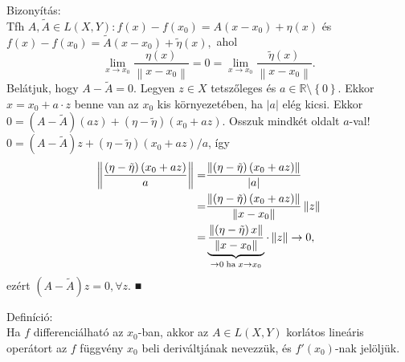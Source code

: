 \documentclass[12pt,a4paper]{scrartcl}
\newenvironment{definicio}{}{}
\newenvironment{bizonyitas}{}{}
\begin{document}
\begin{bizonyitas}

Bizonyítás:\\
Tfh
\(A,\widetilde{A} \in L\left( {X,Y} \right):f\left( x \right) - f\left( x_{0} \right) = A\left( {x - x_{0}} \right) + \eta\left( x \right)\)
és
\(f\left( x \right) - f\left( x_{0} \right) = \widetilde{A}\left( {x - x_{0}} \right) + \widetilde{\eta}{\left( x \right),}\)
ahol
\[\underset{x\rightarrow x_{0}}{\lim}\frac{\eta\left( x \right)}{\left\| {x - x_{0}} \right\|} = 0 = \underset{x\rightarrow x_{0}}{\lim}\frac{\widetilde{\eta}\left( x \right)}{\left\| {x - x_{0}} \right\|}.\]
Belátjuk, hogy \(A - \widetilde{A} = 0\). Legyen \(z \in X\) tetszőleges
és \(a \in {\mathbb{R}}\text{\textbackslash}\left\{ 0 \right\}\). Ekkor
\(x = x_{0} + a \cdot z\) benne van az \(x_{0}\) kis környezetében, ha
\(\left| a \right|\) elég kicsi. Ekkor
\(0 = \left( {A - \widetilde{A}} \right)\left( {az} \right) + \left( {\eta - \widetilde{\eta}} \right)\left( {x_{0} + az} \right)\).
Osszuk mindkét oldalt \(a\)-val!
\(0 = \left( {A - \widetilde{A}} \right)z + \left( {\eta - \widetilde{\eta}} \right)\left( {x_{0} + az} \right)/a\),
így \[\begin{aligned}
  \left\| {\frac{{\left( {\eta  - \tilde \eta } \right)\left( {{x_0} + az} \right)}}{a}} \right\| =  & \frac{{\left\| {\left( {\eta  - \tilde \eta } \right)\left( {{x_0} + az} \right)} \right\|}}{{\left| a \right|}} \\ 
   =  & \frac{{\left\| {\left( {\eta  - \tilde \eta } \right)\left( {{x_0} + az} \right)} \right\|}}{{\left\| {x - {x_0}} \right\|}}\left\| z \right\| \\ 
   =  & \underbrace {\frac{{\left\| {\left( {\eta  - \tilde \eta } \right)x} \right\|}}{{\left\| {x - {x_0}} \right\|}}}_{ \to 0{\text{\;ha\;}}x \to {x_0}} \cdot \left\| z \right\| \to 0, \\ 
\end{aligned} \] ezért
\(\left( {A - \widetilde{A}} \right)z = 0,\forall z\). ■

\end{bizonyitas}

\begin{definicio}

Definíció:\\
Ha \(f\) differenciálható az \(x_{0}\)-ban, akkor az
\(A \in L\left( {X,Y} \right)\) korlátos lineáris operátort az \(f\)
függvény \(x_{0}\) beli deriváltjának nevezzük, és
\(f'\left( x_{0} \right)\)-nak jelöljük.

\end{definicio}
\end{document}
